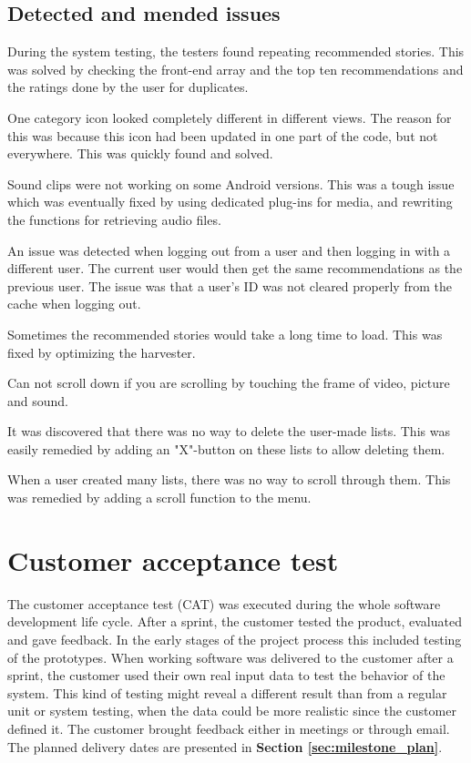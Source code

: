 			
\subsection{Detected and mended issues}

During the system testing, the testers found repeating recommended stories. This was solved by checking the front-end array and the top ten recommendations and the ratings done by the user for duplicates. \newline

One category icon looked completely different in different views. The reason for this was because this icon had been updated in one part of the code, but not everywhere. This was quickly found and solved. \newline

Sound clips were not working on some Android versions. This was a tough issue which was eventually fixed by using dedicated plug-ins for media, and rewriting the functions for retrieving audio files.\newline

An issue was detected when logging out from a user and then logging in with a different user. The current user would then get the same recommendations as the previous user. The issue was that a user's ID was not cleared properly from the cache when logging out. \newline

Sometimes the recommended stories would take a long time to load. This was fixed by optimizing the harvester. \newline

Can not scroll down if you are scrolling by touching the frame of video, picture and sound. \newline

It was discovered that there was no way to delete the user-made lists. This was easily remedied by adding an "X"-button on these lists to allow deleting them. \newline

When a user created many lists, there was no way to scroll through them. This was remedied by adding a scroll function to the menu. \newline

\section{Customer acceptance test}
\label{sec:acceptance_test}

The customer acceptance test (CAT) was executed during the whole software development life cycle. After a sprint, the customer tested the product, evaluated and gave feedback. In the early stages of the project process this included testing of the prototypes. When working software was delivered to the customer after a sprint, the customer used their own real input data to test the behavior of the system. This kind of testing might reveal a different result than from a regular unit or system testing, when the data could be more realistic since the customer defined it. The customer brought feedback either in meetings or through email. The planned delivery dates are presented in \textbf{Section \ref{sec:milestone_plan}}.  

